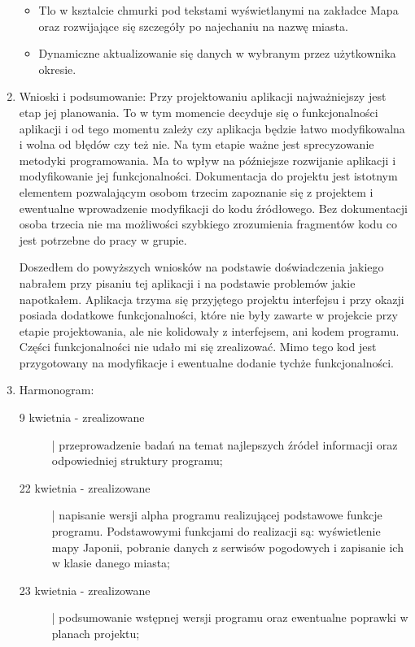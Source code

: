 \documentclass[a4paper]{article}
\begin{document}
\begin{enumerate}
\begin{itemize}
\item Tlo w ksztalcie chmurki pod tekstami wyświetlanymi na zakładce Mapa oraz rozwijające się szczegóły po najechaniu na nazwę miasta.

\item Dynamiczne aktualizowanie się danych w wybranym przez użytkownika okresie.
\end{itemize}

\item Wnioski i podsumowanie:
Przy projektowaniu aplikacji najważniejszy jest etap jej planowania. To w tym momencie decyduje się o funkcjonalności aplikacji i od tego momentu zależy czy aplikacja będzie łatwo modyfikowalna i wolna od błędów czy też nie.
Na tym etapie ważne jest sprecyzowanie metodyki programowania. Ma to wpływ na późniejsze rozwijanie aplikacji i modyfikowanie jej funkcjonalności.
Dokumentacja do projektu jest istotnym elementem pozwalającym osobom trzecim zapoznanie się z projektem i ewentualne wprowadzenie modyfikacji do kodu źródłowego. Bez dokumentacji osoba trzecia nie ma możliwości szybkiego zrozumienia fragmentów kodu co jest potrzebne do pracy w grupie.

Doszedłem do powyższych wniosków na podstawie doświadczenia jakiego nabrałem przy pisaniu tej aplikacji i na podstawie problemów jakie napotkałem. Aplikacja trzyma się przyjętego projektu interfejsu i przy okazji posiada dodatkowe funkcjonalności, które nie były zawarte w projekcie przy etapie projektowania, ale nie kolidowały z interfejsem, ani kodem programu. Części funkcjonalności nie udało mi się zrealizować. Mimo tego kod jest przygotowany na modyfikacje i ewentualne dodanie tychże funkcjonalności.


\item Harmonogram:

\begin{description}
\item[9 kwietnia - zrealizowane] | przeprowadzenie badań na temat najlepszych źródeł informacji oraz odpowiedniej struktury programu;

\item[22 kwietnia - zrealizowane] | napisanie wersji alpha programu realizującej podstawowe funkcje programu. Podstawowymi funkcjami do realizacji są: wyświetlenie mapy Japonii, pobranie danych z serwisów pogodowych i zapisanie ich w klasie danego miasta;

\item[23 kwietnia - zrealizowane] | podsumowanie wstępnej wersji programu oraz ewentualne poprawki w planach projektu;


\end{description}
\end{enumerate}
\end{document}
